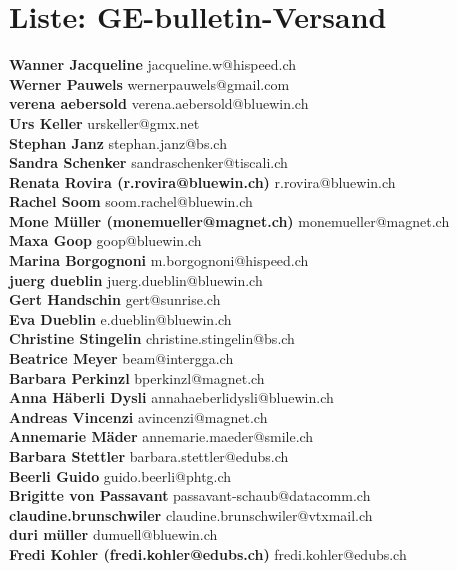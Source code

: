 \documentclass{scrartcl}
\begin{document}
\section*{Liste: GE-bulletin-Versand}
\textbf{Wanner Jacqueline } jacqueline.w@hispeed.ch\\
\textbf{Werner Pauwels } wernerpauwels@gmail.com\\
\textbf{verena aebersold } verena.aebersold@bluewin.ch\\
\textbf{Urs Keller } urskeller@gmx.net\\
\textbf{Stephan Janz } stephan.janz@bs.ch\\
\textbf{Sandra Schenker } sandraschenker@tiscali.ch\\
\textbf{Renata Rovira (r.rovira@bluewin.ch) } r.rovira@bluewin.ch\\
\textbf{Rachel Soom } soom.rachel@bluewin.ch\\
\textbf{Mone Müller  (monemueller@magnet.ch)\n	 } monemueller@magnet.ch\\
\textbf{Maxa Goop } goop@bluewin.ch\\
\textbf{Marina Borgognoni } m.borgognoni@hispeed.ch\\
\textbf{juerg dueblin } juerg.dueblin@bluewin.ch\\
\textbf{Gert Handschin } gert@sunrise.ch\\
\textbf{Eva Dueblin } e.dueblin@bluewin.ch\\
\textbf{Christine Stingelin } christine.stingelin@bs.ch\\
\textbf{Beatrice Meyer } beam@intergga.ch\\
\textbf{Barbara Perkinzl } bperkinzl@magnet.ch\\
\textbf{Anna Häberli Dysli } annahaeberlidysli@bluewin.ch\\
\textbf{Andreas Vincenzi } avincenzi@magnet.ch\\
\textbf{Annemarie Mäder } annemarie.maeder@smile.ch\\
\textbf{Barbara Stettler } barbara.stettler@edubs.ch\\
\textbf{Beerli Guido } guido.beerli@phtg.ch\\
\textbf{Brigitte von Passavant } passavant-schaub@datacomm.ch\\
\textbf{claudine.brunschwiler } claudine.brunschwiler@vtxmail.ch\\
\textbf{duri müller } dumuell@bluewin.ch\\
\textbf{Fredi Kohler (fredi.kohler@edubs.ch) } fredi.kohler@edubs.ch\\
\end{document}
